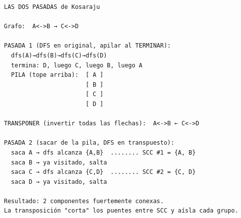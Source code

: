 \begin{dsacomofunciona}
\begin{verbatim}
LAS DOS PASADAS de Kosaraju

Grafo:  A<->B → C<->D

PASADA 1 (DFS en original, apilar al TERMINAR):
  dfs(A)→dfs(B)→dfs(C)→dfs(D)
  termina: D, luego C, luego B, luego A
  PILA (tope arriba):  [ A ]
                       [ B ]
                       [ C ]
                       [ D ]

TRANSPONER (invertir todas las flechas):  A<->B ← C<->D

PASADA 2 (sacar de la pila, DFS en transpuesto):
  saca A → dfs alcanza {A,B}  ........ SCC #1 = {A, B}
  saca B → ya visitado, salta
  saca C → dfs alcanza {C,D}  ........ SCC #2 = {C, D}
  saca D → ya visitado, salta

Resultado: 2 componentes fuertemente conexas.
La transposición "corta" los puentes entre SCC y aísla cada grupo.
\end{verbatim}
\end{dsacomofunciona}


